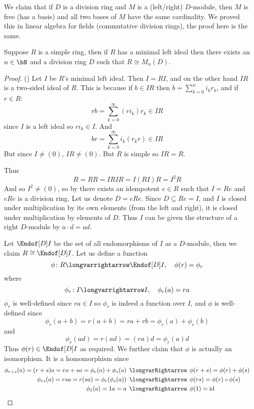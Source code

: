 \documentclass[10pt]{article}
\def\implies{\,\mathrel{\longvarRightarrow}\,}
\let\longto=\longvarrightarrow
\begin{document}
We claim that if $D$ is a division ring and $M$ is a (left/right) $D$-module, then $M$ is free (has a basis) and all two bases of $M$ have the same cardinality.
We proved this in linear algebra for fields (commutative division rings), the proof here is the same.

\begin{thrm*}

    Suppose $R$ is a simple ring, then if $R$ has a minimal left ideal then there exists an $n\in\bN$ and a division ring $D$ such that $R\cong M_n(D)$.

\end{thrm*}

\begin{proof}

    ({})
    Let $I$ be $R$'s minimal left ideal.
    Then $I=RI$, and on the other hand $IR$ is a two-sided ideal of $R$.
    This is because if $b\in IR$ then $b=\sum_{k=0}^n i_kr_k$, and if $r\in R$:
    \[ rb = \sum_{k=0}^\infty (ri_k)r_k \in IR \]
    since $I$ is a left ideal so $ri_k\in I$.
    And
    \[ br = \sum_{k=0}^\infty i_k(r_kr) \in IR \]
    But since $I\neq(0)$, $IR\neq(0)$.
    But $R$ is simple so $IR=R$.

    Thus
    \[ R = RR = IRIR = I(RI)R = I^2R \]
    And so $I^2\neq(0)$, so by  there exists an idempotent $e\in R$ such that $I=Re$ and $eRe$ is a division ring.
    Let us denote $D=eRe$.
    Since $D\subseteq Re=I$, and $I$ is closed under multiplication by its own elements (from the left and right), it is closed under multiplication by elements of $D$.
    Thus $I$ can be given the structure of a right $D$-module by $a\cdot d=ad$.

    Let $\Endof[D]I$ be the set of all endomorphisms of $I$ as a $D$-module, then we claim $R\cong\Endof[D]I$.
    Let us define a function
    \[ \phi\colon R\longto\Endof[D]I,\quad \phi(r) = \phi_r \]
    where
    \[ \phi_r\colon I\longto I,\quad \phi_r(a) = ra \]
    $\phi_r$ is well-defined since $ra\in I$ so $\phi_r$ is indeed a function over $I$, and $\phi$ is well-defined since
    \[ \phi_r(a+b) = r(a+b) = ra+rb = \phi_r(a) + \phi_r(b) \]
    and
    \[ \phi_r(ad) = r(ad) = (ra)d = \phi_r(a)d \]
    Thus $\phi(r)\in\Endof[D]I$ as required.
    We further claim that $\phi$ is actually an isomorphism.
    It is a homomorphism since
    \begin{align*}
        \phi_{r+s}(a) = (r+s)a = ra + sa = \phi_r(a) + \phi_s(a) &\implies \phi(r+s) = \phi(r) + \phi(s) \\
        \phi_{rs}(a) = rsa = r(sa) = \phi_r(\phi_s(a)) &\implies \phi(rs) = \phi(r)\circ\phi(s) \\
        \phi_1(a) = 1a = a &\implies \phi(1) = \mathrm{id}\
    \end{align*}


\end{proof}
\end{document}
